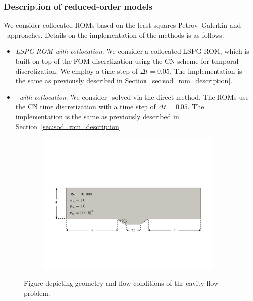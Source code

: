 \subsubsection{Description of reduced-order models}
We consider collocated ROMs based on the least-squares Petrov--Galerkin and \methodAcronym\ approaches. Details on the implementation of the methods is as follows:
\begin{itemize}

\item \textit{LSPG ROM with collocation}: We consider a collocated LSPG ROM, which is built on top of the FOM discretization using the CN scheme for temporal 
discretization. We employ a time step of $\Delta t  = 0.05$. The implementation is the same as previously described in Section~\ref{sec:sod_rom_description}. 
 
\item \textit{\methodAcronymROMs\ with collocation}: We consider \methodAcronymROMs\ solved via the direct method. The ROMs use the CN time discretization with a time step of 
$\Delta t = 0.05$. The implementation is the same as previously described in Section~\ref{sec:sod_rom_description}. 
\end{itemize}

\begin{figure}
\begin{center}
\begin{subfigure}[t]{0.85\textwidth}
\includegraphics[trim={2cm 5.5cm 1cm 7cm},clip,width=0.98\linewidth]{figs/cavity_new/cav_geom.pdf}
\end{subfigure}
\caption{Figure depicting geometry and flow conditions of the cavity flow problem.} 
\label{fig:cav_fig}
\end{center}
\end{figure}

